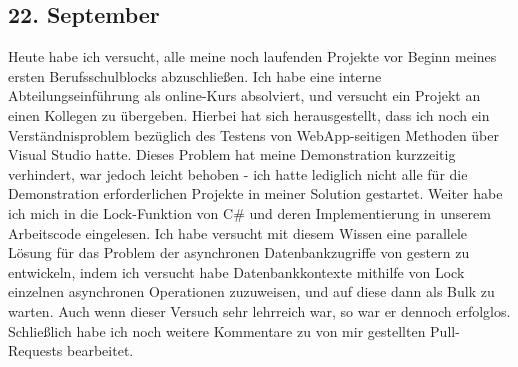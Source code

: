 \subsection{22. September}
Heute habe ich versucht, alle meine noch laufenden Projekte vor Beginn meines ersten Berufsschulblocks abzuschließen. Ich habe eine interne Abteilungseinführung als online-Kurs absolviert, und versucht ein Projekt an einen Kollegen zu übergeben. Hierbei hat sich herausgestellt, dass ich noch ein Verständnisproblem bezüglich des Testens von WebApp-seitigen Methoden über Visual Studio hatte. Dieses Problem hat meine Demonstration kurzzeitig verhindert, war jedoch leicht behoben - ich hatte lediglich nicht alle für die Demonstration erforderlichen Projekte in meiner Solution gestartet. Weiter habe ich mich in die Lock-Funktion von C\# und deren Implementierung in unserem Arbeitscode eingelesen. Ich habe versucht mit diesem Wissen eine parallele Lösung für das Problem der asynchronen Datenbankzugriffe von gestern zu entwickeln, indem ich versucht habe Datenbankkontexte mithilfe von Lock einzelnen asynchronen Operationen zuzuweisen, und auf diese dann als Bulk zu warten. Auch wenn dieser Versuch sehr lehrreich war, so war er dennoch erfolglos. Schließlich habe ich noch weitere Kommentare zu von mir gestellten Pull-Requests bearbeitet.